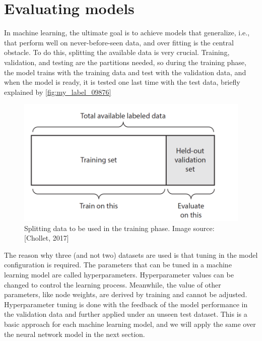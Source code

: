 \section{Evaluating models}
In machine learning, the ultimate goal is to achieve models that generalize, i.e., that perform well on never-before-seen data, and over fitting is the central obstacle. To do this, splitting the available data is very crucial. Training, validation, and testing are the partitions  
needed, so during the training phase, the model trains with the training data and test with the validation data, and when the model is ready, it is tested one last time with the test data, briefly explained by \autoref{fig:my_label_09876} \\
\begin{figure}[H]
    \centering
    \includegraphics[scale=0.6]{Figure/ml__12.png}
    \caption{Splitting data to be used in the training phase. Image source: [Chollet, 2017]}
    \label{fig:my_label_09876}
\end{figure}
The reason why three (and not two) datasets are used is that tuning in the model configuration is required. The parameters that can be tuned in a machine learning model are called hyperparameters\cite{https://doi.org/10.48550/arxiv.1904.11829,https://doi.org/10.48550/arxiv.1412.3555}. Hyperparameter values can be changed to control the learning process. Meanwhile, the value of other parameters, like node weights, are derived by training and cannot be adjusted. Hyperparameter tuning is done with the feedback of the model performance in the validation data and further applied under an unseen test dataset. This is a basic approach for each machine learning model, and we will apply the same over the neural network model in the next section.

